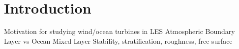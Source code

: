 \section{Introduction}

Motivation for studying wind/ocean turbines in LES
Atmospheric Boundary Layer vs Ocean Mixed Layer
Stability, stratification, roughness, free surface

